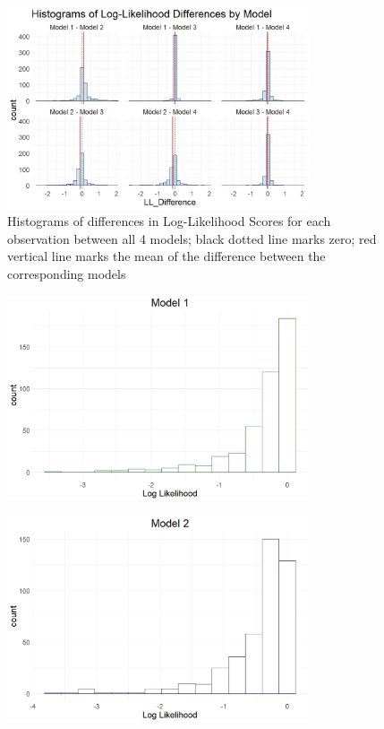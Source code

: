 \documentclass[12pt]{article}
\begin{document}
\begin{figure}[h]
	\centering
	\includegraphics[width=0.8\textwidth]{model_comp_figures/LL_differences.jpeg}
	\caption{Histograms of differences in Log-Likelihood Scores for each observation between all 4 models; black dotted line marks zero; red vertical line marks the mean of the difference between the corresponding models}
	\label{fig:ll_diff}
\end{figure}


\begin{figure}[h]
	\centering
	\includegraphics[width=0.8\textwidth]{model_comp_figures/LL_model1.jpeg}
	\caption{}
	\label{}
\end{figure}

\begin{figure}[h]
	\centering
	\includegraphics[width=0.8\textwidth]{model_comp_figures/LL_model2.jpeg}
	\caption{}
	\label{}
\end{figure}
\end{document}
